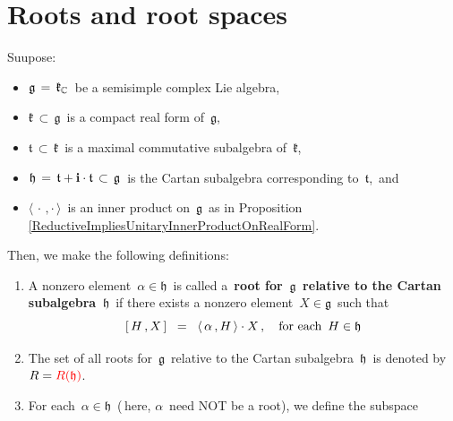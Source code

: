
\section{Roots and root spaces}


\begin{definition}
\label{DefinitionRoots}
\mbox{}
\vskip 0.05cm
\noindent
Suupose:
\begin{itemize}
\item
    \vskip -0.1cm
    $\mathfrak{g} \,=\, \mathfrak{k}_{\mathbb{C}}$\, be a semisimple complex Lie algebra,\,
\item
    $\mathfrak{k} \,\subset\, \mathfrak{g}$\, is a compact real form of \,$\mathfrak{g}$,\,
\item
    $\mathfrak{t} \,\subset\, \mathfrak{k}$\, is a maximal commutative subalgebra of \,$\mathfrak{k}$,\,
\item
    $\mathfrak{h} \,=\, \mathfrak{t} + \mathbf{i}\cdot\mathfrak{t} \,\subset\, \mathfrak{g}$\,
    is the Cartan subalgebra corresponding to \,$\mathfrak{t}$,\, and
\item
    $\langle\,\cdot\,,\cdot\,\rangle$\, is an inner product on
    \,$\mathfrak{g}$\, as in Proposition \ref{ReductiveImpliesUnitaryInnerProductOnRealForm}.
\end{itemize}
Then, we make the following definitions:
\begin{enumerate}
\item
    A nonzero element \,$\alpha \in \mathfrak{h}$\, is called a
    \,\textbf{{\color{red}root} for \,$\mathfrak{g}$\, relative to the Cartan subalgebra \,$\mathfrak{h}$}\,
    if there exists a nonzero element \,$X \in \mathfrak{g}$\, such that
    \begin{equation*}
    \left[\,H\,,X\,\right]
    \;\; = \;\;
        \langle\,\alpha\,,H\,\rangle \cdot X\,,
    \quad
    \textnormal{for each \,$H \in \mathfrak{h}$}
    \end{equation*}
\item
    The set of all roots for \,$\mathfrak{g}$\,
    relative to the Cartan subalgebra \,$\mathfrak{h}$\,
    is denoted by \,$R = {\color{red}R(\mathfrak{h})}$.\,
\item
    For each \,$\alpha \in \mathfrak{h}$\, (\,here, $\alpha$\, need NOT be a root),
    we define the subspace
    \begin{equation*}

\end{equation*}
\end{enumerate}
\end{definition}

